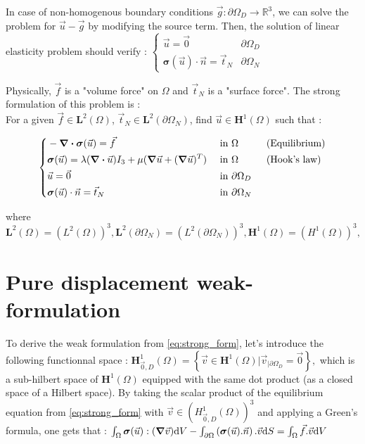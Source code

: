 \documentclass[a4paper,12pt,twoside]{report}
\newcommand{\mtr}{\mathbb{R}}
\newcommand{\dif}{\mathrm{d}}
\begin{document}
In case of non-homogenous boundary conditions $\vec g : \partial \Omega_D \rightarrow \mtr^3$, we can solve the problem for $\vec u - \vec g$ by modifying the source term. Then, the solution of linear elasticity problem should verify :
$
\left\{ \begin{array}{ll}
\vec u = \vec 0 & \partial \Omega_D \\
\boldsymbol{\sigma} (\vec u) \cdot \vec n = \vec t_N & \partial \Omega_N
\end{array} \right.
$

Physically, $\vec f$ is a "volume force" on $\Omega$ and $\vec t_N$ is a "surface force". 
The strong formulation of this problem is : \\
For a given $\vec f \in \boldsymbol L^2(\Omega)$, $\vec t_N \in \boldsymbol L^2(\partial \Omega_N)$, find $\vec u \in \boldsymbol H^1(\Omega)$ such that : 

\begin{tcolorbox}
\begin{equation}
\label{eq:strong_form}
\left\{
\begin{aligned}
    & - \div \boldsymbol{\sigma} (\vec u) = \vec f & \text{ in } & \Omega \hspace{1cm} \text{(Equilibrium)}\\
    & \boldsymbol{\sigma} (\vec u) = \lambda (\div \vec u) I_3 + \mu (\grad \vec u + (\grad \vec u)^T) & \text{ in }& \Omega \hspace{1cm} \text{(Hook's law)} \\
    & \vec u = \vec 0 & \text{ in } &\partial \Omega_D \\
    & \boldsymbol{\sigma} (\vec u) \cdot \vec n = \vec t_N & \text{ in }& \partial \Omega_N
\end{aligned}
\right.
\end{equation}
\end{tcolorbox}

where $\boldsymbol L^2(\Omega) = \left(L^2(\Omega) \right)^3, \boldsymbol L^2(\partial \Omega_N) = \left(L^2(\partial \Omega_N) \right)^3, \boldsymbol H^1(\Omega) = \left(H^1(\Omega) \right)^3, $

\section{Pure displacement weak-formulation} \label{sec:Pure displacement weak-formulation}

To derive the weak formulation from \eqref{eq:strong_form}, let's introduce the following functionnal space : $\boldsymbol H^1_{\vec 0,D}(\Omega) = \left\{ \vec v \in \boldsymbol H^1(\Omega) \Big| \vec v_{|\partial\Omega_D} = \vec 0 \right\},$
which is a sub-hilbert space of $\boldsymbol H^1(\Omega)$ equipped with the same dot product (as a closed space of a Hilbert space). By taking the scalar product of the equilibrium equation from \eqref{eq:strong_form} with $\vec v \in \left(H^1_{\vec 0,D}(\Omega) \right)^3$ and applying a Green's formula, one gets that :
$\int_\Omega \boldsymbol{\sigma} (\vec u) : (\grad \vec v) \dif V - \int_{\partial\Omega} \left(\boldsymbol{\sigma} (\vec u).\vec n \right).\vec v \dif S = \int_\Omega \vec f . \vec v \dif V$
\end{document}
